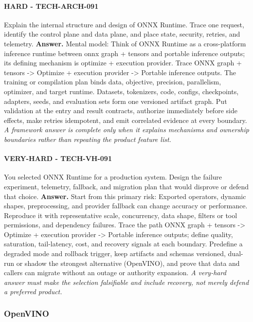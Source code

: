 \paragraph{HARD - TECH-ARCH-091} Explain the internal structure and design of ONNX Runtime. Trace one request, identify the control plane and data plane, and place state, security, retries, and telemetry.
\textbf{Answer.} Mental model: Think of ONNX Runtime as a cross-platform inference runtime between onnx graph + tensors and portable inference outputs; its defining mechanism is optimize + execution provider. Trace ONNX graph + tensors -> Optimize + execution provider -> Portable inference outputs. The training or compilation plan binds data, objective, precision, parallelism, optimizer, and target runtime. Datasets, tokenizers, code, configs, checkpoints, adapters, seeds, and evaluation sets form one versioned artifact graph. Put validation at the entry and result contracts, authorize immediately before side effects, make retries idempotent, and emit correlated evidence at every boundary.
\textit{A framework answer is complete only when it explains mechanisms and ownership boundaries rather than repeating the product feature list.}
\paragraph{VERY-HARD - TECH-VH-091} You selected ONNX Runtime for a production system. Design the failure experiment, telemetry, fallback, and migration plan that would disprove or defend that choice.
\textbf{Answer.} Start from this primary risk: Exported operators, dynamic shapes, preprocessing, and provider fallback can change accuracy or performance. Reproduce it with representative scale, concurrency, data shape, filters or tool permissions, and dependency failures. Trace the path ONNX graph + tensors -> Optimize + execution provider -> Portable inference outputs; define quality, saturation, tail-latency, cost, and recovery signals at each boundary. Predefine a degraded mode and rollback trigger, keep artifacts and schemas versioned, dual-run or shadow the strongest alternative (OpenVINO), and prove that data and callers can migrate without an outage or authority expansion.
\textit{A very-hard answer must make the selection falsifiable and include recovery, not merely defend a preferred product.}
\subsubsection*{OpenVINO}
